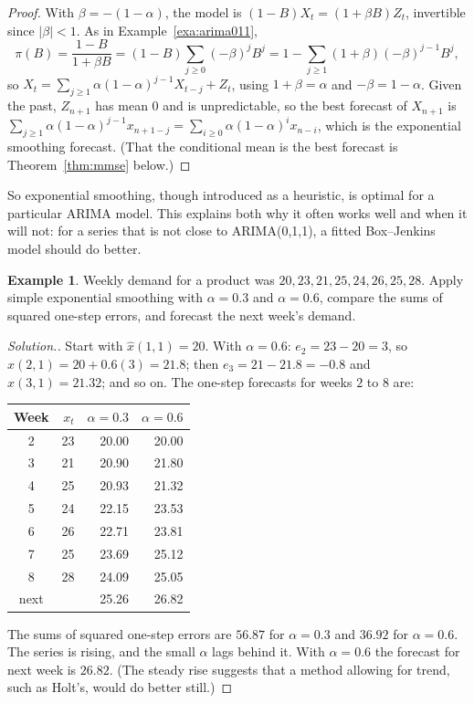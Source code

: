 \documentclass[11pt,a4paper]{article}
\theoremstyle{definition}
\newtheorem{exa}[thm]{Example}
\newenvironment{solution}
  {\renewcommand{\qedsymbol}{}\begin{proof}[\textit{Solution}.]}
  {\end{proof}}
\begin{document}
\begin{proof}
With $\beta = -(1 - \alpha)$, the model is $(1 - B)X_t = (1 + \beta B)Z_t$, invertible since $|\beta| < 1$. As in Example~\ref{exa:arima011},
\[
\pi(B) = \frac{1 - B}{1 + \beta B} = (1 - B)\sum_{j\ge0}(-\beta)^jB^j = 1 - \sum_{j\ge1}(1 + \beta)(-\beta)^{j-1}B^j ,
\]
so $X_t = \sum_{j\ge1}\alpha(1 - \alpha)^{j-1}X_{t-j} + Z_t$, using $1 + \beta = \alpha$ and $-\beta = 1 - \alpha$. Given the past, $Z_{n+1}$ has mean $0$ and is unpredictable, so the best
forecast of $X_{n+1}$ is $\sum_{j\ge1}\alpha(1 - \alpha)^{j-1}x_{n+1-j} = \sum_{i\ge0}\alpha(1 - \alpha)^ix_{n-i}$, which is the exponential smoothing forecast. (That the
conditional mean is the best forecast is Theorem~\ref{thm:mmse} below.)
\end{proof}

So exponential smoothing, though introduced as a heuristic, is optimal for a particular ARIMA model. This
explains both why it often works well and when it will not: for a series that is not close to ARIMA(0,1,1), a
fitted Box--Jenkins model should do better.

\begin{exa}\label{exa:ses}
Weekly demand for a product was $20, 23, 21, 25, 24, 26, 25, 28$. Apply simple exponential smoothing with $\alpha = 0.3$ and
$\alpha = 0.6$, compare the sums of squared one-step errors, and forecast the next week's demand.
\end{exa}

\begin{solution}
Start with $\hat x(1, 1) = 20$. With $\alpha = 0.6$: $e_2 = 23 - 20 = 3$, so $\hat x(2, 1) = 20 + 0.6(3) = 21.8$; then $e_3 = 21 - 21.8 = -0.8$ and $\hat x(3, 1) = 21.32$; and so
on. The one-step forecasts for weeks $2$ to $8$ are:
\begin{center}
\begin{tabular}{crrr}
Week & $x_t$ & $\alpha = 0.3$ & $\alpha = 0.6$ \\
\hline
2 & 23 & 20.00 & 20.00 \\
3 & 21 & 20.90 & 21.80 \\
4 & 25 & 20.93 & 21.32 \\
5 & 24 & 22.15 & 23.53 \\
6 & 26 & 22.71 & 23.81 \\
7 & 25 & 23.69 & 25.12 \\
8 & 28 & 24.09 & 25.05 \\
next &  & 25.26 & 26.82 \\
\end{tabular}
\end{center}
The sums of squared one-step errors are $56.87$ for $\alpha = 0.3$ and $36.92$ for $\alpha = 0.6$. The series is rising, and the small $\alpha$ lags
behind it. With $\alpha = 0.6$ the forecast for next week is $26.82$. (The steady rise suggests that a method allowing for trend,
such as Holt's, would do better still.)
\end{solution}
\end{document}

